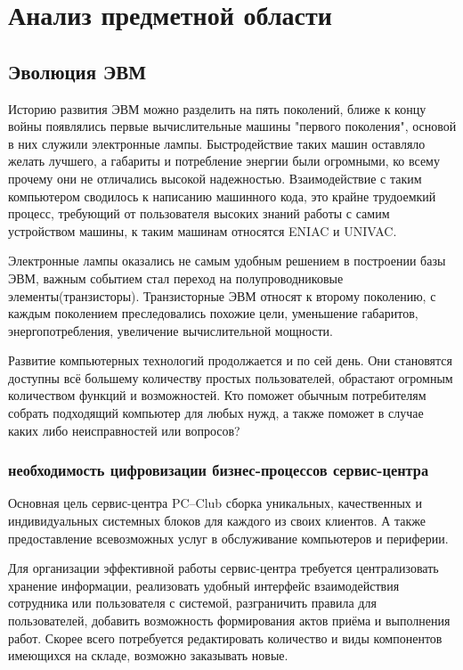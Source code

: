 \section{Анализ предметной области}
\subsection{Эволюция ЭВМ}

Историю развития ЭВМ можно разделить на пять поколений, ближе к концу войны появлялись первые вычислительные машины "первого поколения", основой в них служили электронные лампы. Быстродействие таких машин оставляло желать лучшего, а габариты и потребление энергии были огромными, ко всему прочему они не отличались высокой надежностью. Взаимодействие с таким компьютером сводилось к написанию машинного кода, это крайне трудоемкий процесс, требующий от пользователя высоких знаний работы с самим устройством машины, к таким машинам относятся ENIAC и UNIVAC.

Электронные лампы оказались не самым удобным решением в построении базы ЭВМ, важным событием стал переход на полупроводниковые элементы(транзисторы). Транзисторные ЭВМ относят к второму поколению, с каждым поколением преследовались похожие цели, уменьшение габаритов, энергопотребления, увеличение вычислительной мощности.

Развитие компьютерных технологий продолжается и по сей день. Они становятся доступны всё большему количеству простых пользователей, обрастают огромным количеством функций и возможностей. Кто поможет обычным потребителям собрать подходящий компьютер для любых нужд, а также поможет в случае каких либо неисправностей или вопросов?

\subsubsection{необходимость цифровизации бизнес-процессов сервис-центра}
Основная цель сервис-центра PC--Club сборка уникальных, качественных и индивидуальных системных блоков для каждого из своих клиентов. А также предоставление всевозможных услуг в обслуживание компьютеров и периферии. 

Для организации эффективной работы сервис-центра требуется централизовать хранение информации, реализовать удобный интерфейс взаимодействия сотрудника или пользователя с системой, разграничить правила для пользователей, добавить возможность формирования актов приёма и выполнения работ. Скорее всего потребуется редактировать количество и виды компонентов имеющихся на складе, возможно заказывать новые.

